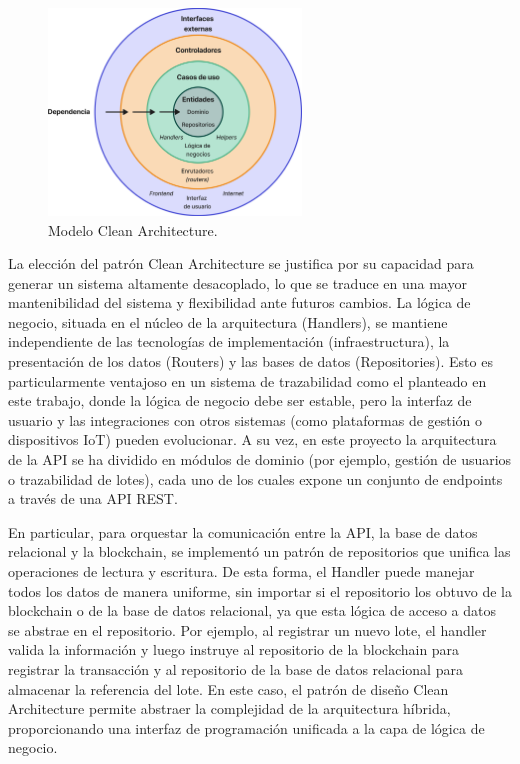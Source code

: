 \begin{figure}[!htb]
\centering
\includegraphics[width=0.6\textwidth]{Figures/clean-architecture.png}
\caption{Modelo Clean Architecture.}
\label{fig:clean-architecture}
\end{figure}

La elección del patrón Clean Architecture se justifica por su capacidad para generar un sistema altamente desacoplado, lo que se traduce en una mayor mantenibilidad del sistema y flexibilidad ante futuros cambios. La lógica de negocio, situada en el núcleo de la arquitectura (Handlers), se mantiene independiente de las tecnologías de implementación (infraestructura), la presentación de los datos (Routers) y las bases de datos (Repositories). Esto es particularmente ventajoso en un sistema de trazabilidad como el planteado en este trabajo, donde la lógica de negocio debe ser estable, pero la interfaz de usuario y las integraciones con otros sistemas (como plataformas de gestión o dispositivos IoT) pueden evolucionar. A su vez, en este proyecto la arquitectura de la API se ha dividido en módulos de dominio (por ejemplo, gestión de usuarios o trazabilidad de lotes), cada uno de los cuales expone un conjunto de endpoints a través de una API REST.

En particular, para orquestar la comunicación entre la API, la base de datos relacional y la blockchain, se implementó un patrón de repositorios que unifica las operaciones de lectura y escritura. De esta forma, el Handler puede manejar todos los datos de manera uniforme, sin importar si el repositorio los obtuvo de la blockchain o de la base de datos relacional, ya que esta lógica de acceso a datos se abstrae en el repositorio. Por ejemplo, al registrar un nuevo lote, el handler valida la información y luego instruye al repositorio de la blockchain para registrar la transacción y al repositorio de la base de datos relacional para almacenar la referencia del lote. En este caso, el patrón de diseño Clean Architecture permite abstraer la complejidad de la arquitectura híbrida, proporcionando una interfaz de programación unificada a la capa de lógica de negocio.

